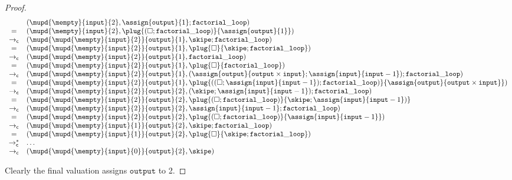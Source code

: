 \documentclass{amsbook}
\theoremstyle{definition}
\theoremstyle{remark}
\numberwithin{section}{chapter}
\numberwithin{equation}{chapter}
\begin{document}
\begin{proof}
  $$\begin{array}{cl}
    & (\mupd{\mempty}{\mathtt{input}}{2}, \assign{\mathtt{output}}{1}; \mathtt{factorial\_loop}) \\
    = & (\mupd{\mempty}{\mathtt{input}}{2}, \plug{(\Box; \mathtt{factorial\_loop})}{\assign{\mathtt{output}}{1}}) \\
    \to_\mathsf{c} & (\mupd{\mupd{\mempty}{\mathtt{input}}{2}}{\mathtt{output}}{1}, \skipe; \mathtt{factorial\_loop}) \\
    = & (\mupd{\mupd{\mempty}{\mathtt{input}}{2}}{\mathtt{output}}{1}, \plug{\Box}{\skipe; \mathtt{factorial\_loop}}) \\
    \to_\mathsf{c} & (\mupd{\mupd{\mempty}{\mathtt{input}}{2}}{\mathtt{output}}{1}, \mathtt{factorial\_loop}) \\
    = & (\mupd{\mupd{\mempty}{\mathtt{input}}{2}}{\mathtt{output}}{1}, \plug{\Box}{\mathtt{factorial\_loop}}) \\
    \to_\mathsf{c} & (\mupd{\mupd{\mempty}{\mathtt{input}}{2}}{\mathtt{output}}{1}, (\assign{\mathtt{output}}{\mathtt{output} \times \mathtt{input}}; \assign{\mathtt{input}}{\mathtt{input} - 1}); \mathtt{factorial\_loop}) \\
    = & (\mupd{\mupd{\mempty}{\mathtt{input}}{2}}{\mathtt{output}}{1}, \plug{((\Box; \assign{\mathtt{input}}{\mathtt{input} - 1}); \mathtt{factorial\_loop})}{\assign{\mathtt{output}}{\mathtt{output} \times \mathtt{input}}}) \\
    \to_\mathsf{c} & (\mupd{\mupd{\mempty}{\mathtt{input}}{2}}{\mathtt{output}}{2}, (\skipe; \assign{\mathtt{input}}{\mathtt{input} - 1}); \mathtt{factorial\_loop}) \\
    = & (\mupd{\mupd{\mempty}{\mathtt{input}}{2}}{\mathtt{output}}{2}, \plug{(\Box; \mathtt{factorial\_loop})}{\skipe; \assign{\mathtt{input}}{\mathtt{input} - 1})} \\
    \to_\mathsf{c} & (\mupd{\mupd{\mempty}{\mathtt{input}}{2}}{\mathtt{output}}{2}, \assign{\mathtt{input}}{\mathtt{input} - 1}; \mathtt{factorial\_loop}) \\
    = & (\mupd{\mupd{\mempty}{\mathtt{input}}{2}}{\mathtt{output}}{2}, \plug{(\Box; \mathtt{factorial\_loop})}{\assign{\mathtt{input}}{\mathtt{input} - 1}}) \\
    \to_\mathsf{c} & (\mupd{\mupd{\mempty}{\mathtt{input}}{1}}{\mathtt{output}}{2}, \skipe; \mathtt{factorial\_loop}) \\
    = & (\mupd{\mupd{\mempty}{\mathtt{input}}{1}}{\mathtt{output}}{2}, \plug{\Box}{\skipe; \mathtt{factorial\_loop}}) \\
    \to^*_\mathsf{c} & \ldots \\
    \to_\mathsf{c} & (\mupd{\mupd{\mempty}{\mathtt{input}}{0}}{\mathtt{output}}{2}, \skipe)
  \end{array}$$

  Clearly the final valuation assigns $\mathtt{output}$ to 2.
\end{proof}
\end{document}
